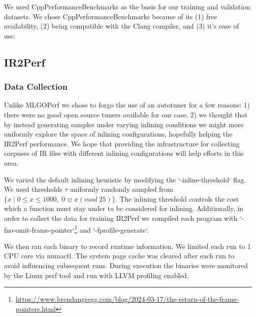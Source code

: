 \documentclass[nohyperref]{article}
\theoremstyle{plain}
\theoremstyle{definition}
\theoremstyle{remark}
\begin{document}
We used CppPerformanceBenchmarks as the basis for our training and validation datasets. We chose CppPerformanceBenchmarks because of its (1) free availability, (2) being compatible with the Clang compiler, and (3) it's ease of use.

%

\subsection{IR2Perf}
\subsubsection{Data Collection}
Unlike MLGOPerf we chose to forgo the use of an autotuner for a few reasons: 1) there were no good open source tuners available for our case, 2) we thought that by instead generating samples under varying inlining conditions we might more uniformly explore the space of inlining configurations, hopefully helping the IR2Perf performance. We hope that providing the infrastructure for collecting corpuses of IR files with different inlining configurations will help efforts in this area.

We varied the default inlining heuristic by modifying the `-inline-threshold` flag. We used thresholds $\tau$ uniformly randomly sampled from $\bigr\{x\;|\;0 \leq x \leq 1000,\;0 \equiv x (mod\;25)\bigr\}$. The inlining threshold controls the cost which a function must stay under to be considered for inlining. Additionally, in order to collect the data for training IR2Perf we compiled each program with `-fno-omit-frame-pointer`\footnote{\href{https://www.brendangregg.com/blog/2024-03-17/the-return-of-the-frame-pointers.html}{https://www.brendangregg.com/blog/2024-03-17/the-return-of-the-frame-pointers.html}} and `-fprofile-generate`.

We then ran each binary to record runtime information. We limited each run to 1 CPU core via numactl. The system page cache was cleared after each run to avoid influencing subsequent runs. During execution the binaries were monitored by the Linux perf tool and run with LLVM profiling enabled.
\end{document}
